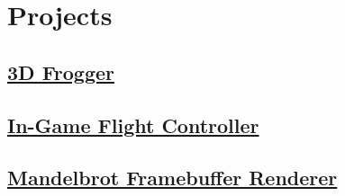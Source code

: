 \documentclass{amsart}
\theoremstyle{definition} %
\begin{document}
\section{Projects}

\subsection{\href{https://github.com/Hazelfire/I3DAssignment2}{3D Frogger}}

\subsection{\href{https://github.com/1wsx10/VectorThrust2}{In-Game Flight Controller}}

\subsection{\href{https://github.com/1wsx10/mandelbrot}{Mandelbrot Framebuffer Renderer}}


\appendix

\begin{thebibliography}{99}


\end{thebibliography}
\end{document}
